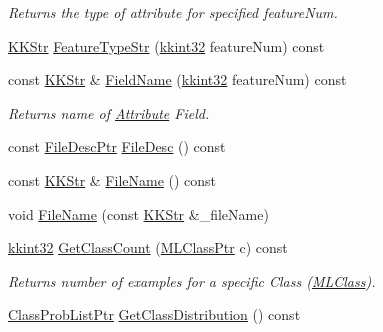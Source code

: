 \begin{DoxyCompactItemize}
\begin{DoxyCompactList}\small\item\em Returns the type of attribute for specified \textquotesingle{}feature\+Num\textquotesingle{}. \end{DoxyCompactList}\item 
\hyperlink{class_k_k_b_1_1_k_k_str}{K\+K\+Str} \hyperlink{class_k_k_m_l_l_1_1_feature_vector_list_ab598c4d0da0651c049bf15813a11e69d}{Feature\+Type\+Str} (\hyperlink{namespace_k_k_b_a8fa4952cc84fda1de4bec1fbdd8d5b1b}{kkint32} feature\+Num) const 
\item 
const \hyperlink{class_k_k_b_1_1_k_k_str}{K\+K\+Str} \& \hyperlink{class_k_k_m_l_l_1_1_feature_vector_list_a6cc12c28c10a7531f81eba6e36ac92fc}{Field\+Name} (\hyperlink{namespace_k_k_b_a8fa4952cc84fda1de4bec1fbdd8d5b1b}{kkint32} feature\+Num) const 
\begin{DoxyCompactList}\small\item\em Returns name of \hyperlink{class_k_k_m_l_l_1_1_attribute}{Attribute} Field. \end{DoxyCompactList}\item 
const \hyperlink{namespace_k_k_m_l_l_aa0d0b6ab4ec18868a399b8455b05d914}{File\+Desc\+Ptr} \hyperlink{class_k_k_m_l_l_1_1_feature_vector_list_a736923be9c4ac7553a5aa87dd24efd16}{File\+Desc} () const 
\item 
const \hyperlink{class_k_k_b_1_1_k_k_str}{K\+K\+Str} \& \hyperlink{class_k_k_m_l_l_1_1_feature_vector_list_a48c9a43f0aa93a2251a5b8d4e38c4deb}{File\+Name} () const 
\item 
void \hyperlink{class_k_k_m_l_l_1_1_feature_vector_list_a6665929f17ebd55f6a2bd2e152323d23}{File\+Name} (const \hyperlink{class_k_k_b_1_1_k_k_str}{K\+K\+Str} \&\+\_\+file\+Name)
\item 
\hyperlink{namespace_k_k_b_a8fa4952cc84fda1de4bec1fbdd8d5b1b}{kkint32} \hyperlink{class_k_k_m_l_l_1_1_feature_vector_list_a4a30e75d307b9d93df716eb4d81abb93}{Get\+Class\+Count} (\hyperlink{namespace_k_k_m_l_l_ac272393853d59e72e8456f14cd6d8c23}{M\+L\+Class\+Ptr} c) const 
\begin{DoxyCompactList}\small\item\em Returns number of examples for a specific Class (\hyperlink{class_k_k_m_l_l_1_1_m_l_class}{M\+L\+Class}). \end{DoxyCompactList}\item 
\hyperlink{namespace_k_k_m_l_l_a60f96a524ddb189eff2b4391cf0b651c}{Class\+Prob\+List\+Ptr} \hyperlink{class_k_k_m_l_l_1_1_feature_vector_list_a74ce131e68cdd499cf10d10c0573065e}{Get\+Class\+Distribution} () const 

\end{DoxyCompactItemize}
